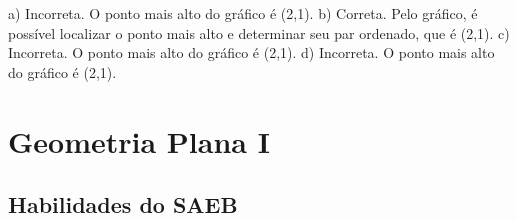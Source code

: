 \begin{escolha}
\begin{boxmedio}
\begin{boxmedio}
{\begin{boxpeq}
\begin{boxpeq}
{\begin{boxpeq}
\begin{boxmedio}
\begin{boxmedio}
\begin{boxpeq}
\begin{boxmedio}
\begin{boxpeq}
\begin{boxpeq}
\begin{boxpeq}
\begin{boxpeq}
\begin{boxmedio}
{\begin{boxmedio}
\begin{boxmedio}
\begin{boxpeq}
\begin{boxmedio}
\begin{boxpeq}
\begin{boxpeq}
\begin{boxpeq}
\begin{escolha}
{\begin{boxmedio}
\begin{boxpeq}
\begin{boxpeq}
\begin{boxpeq}
\begin{boxpeq}
\begin{boxpeq}
\begin{boxmedio}
\begin{boxpeq}
\begin{boxpeq}
\begin{boxpeq}
{\begin{boxpeq}
\begin{boxmedio}
\begin{boxpeq}
\begin{boxpeq}
\begin{boxpeq}
{\begin{boxpeq}
\begin{boxmedio}
{\begin{boxpeq}
\begin{boxpeq}
\begin{boxmedio}
\begin{boxmedio}
\begin{boxpeq}
\begin{boxpeq}
{\begin{boxpeq}
{a) Incorreta. O ponto mais alto do gráfico é (2,1).
b) Correta. Pelo gráfico, é possível localizar o ponto mais alto e
determinar seu par ordenado, que é (2,1).  
c) Incorreta. O ponto mais alto do gráfico é (2,1).
d) Incorreta. O ponto mais alto do gráfico é (2,1).}

\chapter{Geometria Plana I}

\section{Habilidades do SAEB}

\begin{itemize}


\end{itemize}
\end{boxpeq}}
\end{boxpeq}
\end{boxpeq}
\end{boxmedio}
\end{boxmedio}
\end{boxpeq}
\end{boxpeq}}
\end{boxmedio}
\end{boxpeq}}
\end{boxpeq}
\end{boxpeq}
\end{boxpeq}
\end{boxmedio}
\end{boxpeq}}
\end{boxpeq}
\end{boxpeq}
\end{boxpeq}
\end{boxmedio}
\end{boxpeq}
\end{boxpeq}
\end{boxpeq}
\end{boxpeq}
\end{boxpeq}
\end{boxmedio}}
\end{escolha}
\end{boxpeq}
\end{boxpeq}
\end{boxpeq}
\end{boxmedio}
\end{boxpeq}
\end{boxmedio}
\end{boxmedio}}
\end{boxmedio}
\end{boxpeq}
\end{boxpeq}
\end{boxpeq}
\end{boxpeq}
\end{boxmedio}
\end{boxpeq}
\end{boxmedio}
\end{boxmedio}
\end{boxpeq}}
\end{boxpeq}
\end{boxpeq}}
\end{boxmedio}
\end{boxmedio}
\end{escolha}
